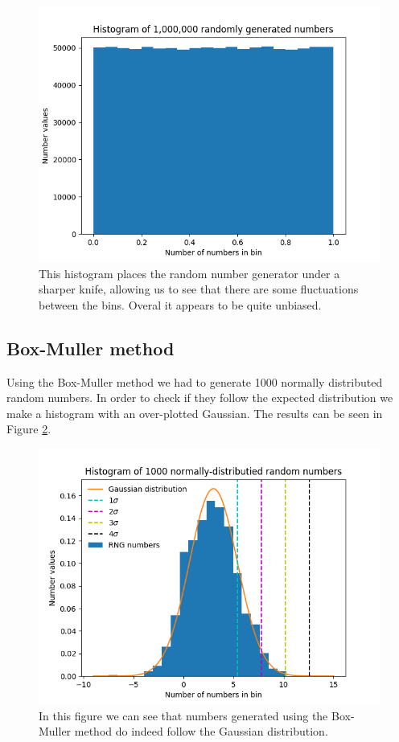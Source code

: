 \documentclass[a4paper,10pt]{article}
\begin{document}
\begin{figure}[h!]
  \centering
  \includegraphics[width=0.8\linewidth]{./plots/1c.png}
  \caption{This histogram places the random number generator under a sharper knife, allowing us to see that there are some fluctuations between the bins. Overal it appears to be quite unbiased.}
  \label{fig:1c}
\end{figure}

\subsection{Box-Muller method}
Using the Box-Muller method we had to generate 1000 normally distributed random numbers. In order to check if they follow the expected distribution we make a histogram with an over-plotted Gaussian. The results can be seen in Figure \ref{fig:1d}.

\begin{figure}[h!]
  \centering
  \includegraphics[width=0.8\linewidth]{./plots/1d.png}
  \caption{In this figure we can see that numbers generated using the Box-Muller method do indeed follow the Gaussian distribution.}
  \label{fig:1d}
\end{figure}
\end{document}
